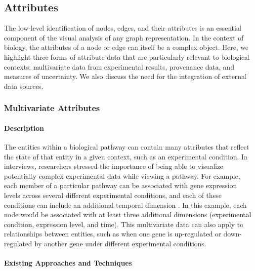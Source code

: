\subsection*{Attributes}

The low-level identification of nodes, edges, and their attributes is an essential component of the visual analysis of any graph representation.
In the context of biology, the attributes of a node or edge can itself be a complex object.
Here, we highlight three forms of attribute data that are particularly relevant to biological contexts: multivariate data from experimental results, provenance data, and measures of uncertainty.
We also discuss the need for the integration of external data sources.

\subsubsection*{Multivariate Attributes}

\paragraph*{Description}

The entities within a biological pathway can contain many attributes that reflect the state of that entity in a given context, such as an experimental condition.
In interviews, researchers stressed the importance of being able to visualize potentially complex experimental data while viewing a pathway.
For example, each member of a particular pathway can be associated with gene expression levels across several different experimental conditions, and each of these conditions can include an additional temporal dimension \cite{Barsky2008cerebral}.
In this example, each node would be associated with at least three additional dimensions (experimental condition, expression level, and time).
This multivariate data can also apply to relationships between entities, such as when one gene is up-regulated or down-regulated by another gene under different experimental conditions.

\paragraph*{Existing Approaches and Techniques}

